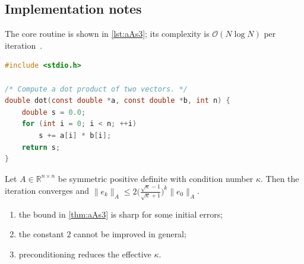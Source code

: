 \lipsum[102-103]

\subsection{Implementation notes}\label{sec:aAs3-i}
The core routine is shown in \cref{lst:aAs3}; its complexity is $\mathcal{O}(N\log N)$ per iteration~\cite{appx-3}.

\begin{lstlisting}[language=c,caption={Reference implementation for aAs3.},label={lst:aAs3}]
#include <stdio.h>

/* Compute a dot product of two vectors. */
double dot(const double *a, const double *b, int n) {
    double s = 0.0;
    for (int i = 0; i < n; ++i)
        s += a[i] * b[i];
    return s;
}
\end{lstlisting}

\kant[9-11]
\begin{theorem}\label{thm:aAs3}
Let $A\in\mathbb{R}^{n\times n}$ be symmetric positive definite with condition number $\kappa$. Then the iteration converges and
$\lVert e_k\rVert_A \le 2\bigl(\tfrac{\sqrt\kappa-1}{\sqrt\kappa+1}\bigr)^k\lVert e_0\rVert_A$.
\end{theorem}
\begin{enumerate}[label=(\roman*)]
\item the bound in \cref{thm:aAs3} is sharp for some initial errors;
\item the constant $2$ cannot be improved in general;
\item preconditioning reduces the effective $\kappa$.
\end{enumerate}

\lipsum[24-24]
